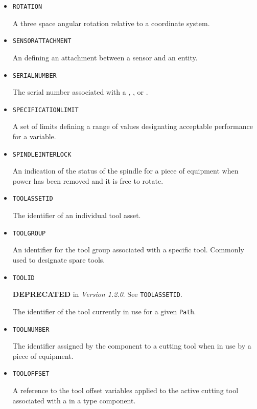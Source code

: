 \begin{itemize}
\item \texttt{ROTATION}  

A three space angular rotation relative to a coordinate system.


\item \texttt{SENSOR\textunderscore ATTACHMENT}  

An  defining an \gls{attachment} between a sensor and an entity.


\item \texttt{SERIAL\textunderscore NUMBER}  

The serial number associated with a , , or .


\item \texttt{SPECIFICATION\textunderscore LIMIT}  

A set of limits defining a range of values designating acceptable performance for a variable.


\item \texttt{SPINDLE\textunderscore INTERLOCK}  

An indication of the status of the spindle for a piece of equipment when power has been removed and it is free to rotate.


\item \texttt{TOOL\textunderscore ASSET\textunderscore ID}  

The identifier of an individual tool asset.


\item \texttt{TOOL\textunderscore GROUP}  

An identifier for the tool group associated with a specific tool. Commonly used to designate spare tools.


\item \texttt{TOOL\textunderscore ID}  

\textbf{DEPRECATED} in \textit{Version 1.2.0}.   See \texttt{TOOL\textunderscore ASSET\textunderscore ID}.

The identifier of the tool currently in use for a given \texttt{Path}.


\item \texttt{TOOL\textunderscore NUMBER}  

The identifier assigned by the  component to a cutting tool when in use by a piece of equipment.


\item \texttt{TOOL\textunderscore OFFSET}  

A reference to the tool offset variables applied to the active cutting tool associated with a  in a  type component.


\end{itemize}
